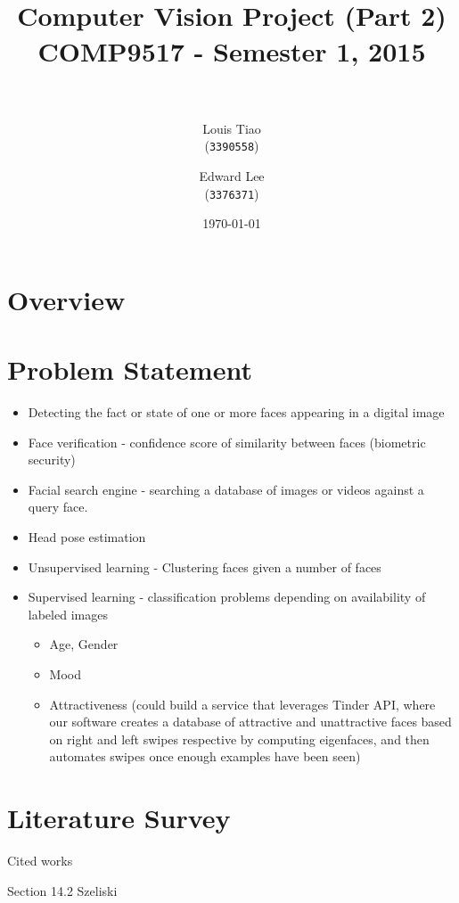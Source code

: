 \documentclass[11pt]{article} %
\title{	
\normalfont \normalsize 
\horrule{0.5pt} \\[0.4cm] %
\Large Computer Vision Project (Part 2) \\ [0.1cm] %
\large COMP9517 - Semester 1, 2015 \\ [0.2cm]
\horrule{2pt} \\[0.5cm] %
}
\author{
	Louis Tiao \\
	(\texttt{3390558})
	\and
	Edward Lee\\
	(\texttt{3376371})
} %
\date{\normalsize\today} %
\theoremstyle{plain}
\theoremstyle{definition}
\theoremstyle{remark}
\numberwithin{equation}{section} %
\numberwithin{figure}{section} %
\numberwithin{table}{section} %
\begin{document}
\maketitle %

\section{Overview}

\section{Problem Statement}


\begin{itemize}
	\item Detecting the fact or state of one or more faces appearing in a 
		digital image
  \item Face verification - confidence score of similarity between faces (biometric security)
	\item Facial search engine - searching a database of images or videos against a query face.
  \item Head pose estimation
  \item Unsupervised learning - Clustering faces given a number of faces
  \item Supervised learning - classification problems depending on availability of labeled images
    \begin{itemize}
      \item Age, Gender
      \item Mood
      \item Attractiveness (could build a service that leverages Tinder API, where our software
      creates a database of attractive and unattractive faces based on right and left swipes respective
      by computing eigenfaces, and then automates swipes once enough examples have been seen)
    \end{itemize}
\end{itemize}

\section{Literature Survey}

Cited works \citep{litvin2003,battiato2007sift,grundmann2011auto,liu2009content,Matsushita2006}

Section 14.2 Szeliski
\end{document}
